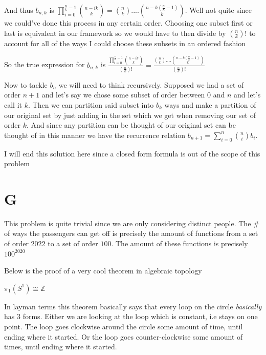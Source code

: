 \documentclass[paper=a4,fontsize=paper,12.5pt]{book}
\newcommand{\3}{\vspace*{3mm}}
\newcommand*{\comb}[2]{\binom{#1}{#2}}
\newcommand{\Z}{\mathbb{Z}}
\begin{document}
\3

And thus ${b}_{n,k}$ is $\prod\limits_{i = 0}^{\frac{n}{k} -1}\comb{n - ik}{k} = \comb{n}{k}....\comb{n - k(\frac{n}{k} -1)}{k}$. Well not quite since we could've done this process in any certain order. Choosing one subset first or last is equivalent in our framework so we would have to then divide by $(\frac{n}{k})!$ to account for all of the ways I could choose these subsets in an ordered fashion

\3

So the true expression for ${b}_{n,k}$ is $ \frac{\prod\limits_{i = 0}^{\frac{n}{k} -1}\comb{n - ik}{k}}{(\frac{n}{k})!} = \frac{\comb{n}{k}....\comb{n - k(\frac{n}{k} -1)}{k}}{(\frac{n}{k})!}$


\3

Now to tackle ${b}_{n}$ we will need to think recursively. Supposed we had a set of order $n+1$ and let's say we chose some subset of order between $0$ and $n$ and let's call it $k$. Then we can partition said subset into ${b}_{k}$ ways and make a partition of our original set by just adding in the set which we get when removing our set of order $k$. And since any partition can be thought of our original set can be thought of in this manner we have the recurrence relation ${b}_{n+1} = \sum\limits_{i = 0}^{n}\comb{n}{i} {b}_{i}$. 

\3

I will end this solution here since a closed form formula is out of the scope of this problem

\section*{G}

This problem is quite trivial since we are only considering distinct people. The $\#$ of ways the passengers can get off is precisely the amount of functions from a set of order $2022$ to a set of order $100$. The amount of these functions is precisely ${100}^{2020}$

\3

Below is the proof of a very cool theorem in algebraic topology

\3

\begin{theorem}

${\pi}_{1}({{S}^{1}}) \cong \Z$


\end{theorem}

\newpage

In layman terms this theorem basically says that every loop on the circle \textit{basically} has $3$ forms. Either we are looking at the loop which is constant, i.e stays on one point. The loop goes clockwise around the circle some amount of time, until ending where it started. Or the loop goes counter-clockwise some amount of times, until ending where it started.
\end{document}
